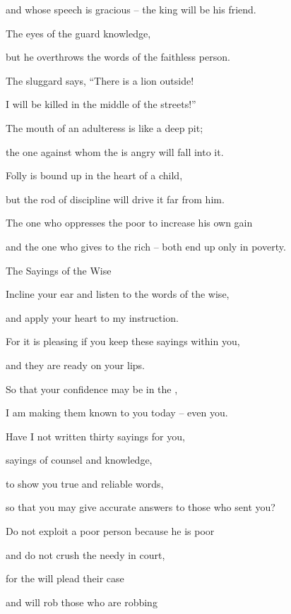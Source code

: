 {\par }{\Q and whose speech
is gracious –
the king
will be his friend.
\par }{\Q {}The eyes
of the {}
guard
knowledge,
\par }{\Q but he overthrows
the words
of the faithless person.
\par }{\Q {}The sluggard
says, “There is a lion
outside!
\par }{\Q I will be killed
in the middle
of the streets!”
\par }{\Q {}The mouth
of an adulteress
is like a deep
pit;
\par }{\Q the one against whom the
{}
is angry
will
fall into it.
\par }{\Q {}Folly
is bound up
in the heart
of a child,
\par }{\Q but the rod
of discipline
will drive it far
from him.
\par }{\Q {}The one who oppresses
the poor
to increase
his own gain
\par }{\Q and the one who gives
to the rich –
both end up only
in poverty.
\par }{\SH The Sayings of the Wise
\par }{\Q {}Incline
your ear
and listen
to the words
of the wise,
\par }{\Q and apply
your heart
to my instruction.
\par }{\Q {}For
it is pleasing
if
you keep
these sayings within you,
\par }{\Q and they are ready
on
your lips.
\par }{\Q {}So that your confidence
may be
in the
{},
\par }{\Q I am making them known
to you today –
even
you.
\par }{\Q {}Have I not
written
thirty sayings
for you,
\par }{\Q sayings
of counsel and knowledge,
\par }{\Q {}to show
you true
and reliable
words,
\par }{\Q so that you may give
accurate
answers
to those who sent you?
\par }{\Q {}Do not
exploit
a poor
person because
he is
poor
\par }{\Q and do not
crush
the needy
in court,
\par }{\Q {}for
the
{}
will plead
their case
\par }{\Q and will rob those who are robbing
}
